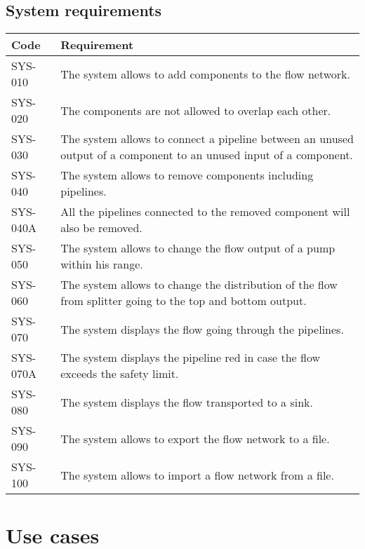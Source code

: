 \subsection{System requirements}
\begin{tabularx}{\textwidth}{|p{2cm}X|}\hline
Code & Requirement \\\hline
SYS-010 & The system allows to add components to the flow network.\\\hline
SYS-020 & The components are not allowed to overlap each other.\\\hline
SYS-030 & The system allows to connect a pipeline between an unused output of a component to an unused input of a component.\\\hline
SYS-040 & The system allows to remove components including pipelines.\\\hline
SYS-040A & All the pipelines connected to the removed component will also be removed.\\\hline
SYS-050 & The system allows to change the flow output of a pump within his range.\\\hline
SYS-060 & The system allows to change the distribution of the flow from splitter going to the top and bottom output.\\\hline
SYS-070 & The system displays the flow going through the pipelines.\\\hline
SYS-070A & The system displays the pipeline red in case the flow exceeds the safety limit.\\\hline
SYS-080 & The system displays the flow transported to a sink.\\\hline
SYS-090 & The system allows to export the flow network to a file.\\\hline
SYS-100 & The system allows to import a flow network from a file.\\\hline
\end{tabularx}

\section{Use cases}

